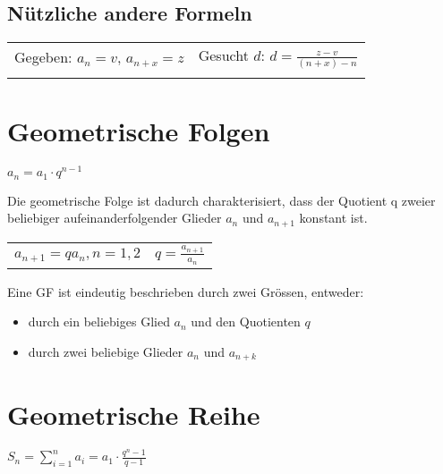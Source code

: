 \documentclass[../main.tex]{subfiles}
\begin{document}
\subsection{Nützliche andere Formeln}

\begin{tabularx}{1\textwidth} { 
    >{\centering\arraybackslash}X 
    >{\centering\arraybackslash}X  }
    Gegeben: $a_n = v$, $a_{n+x} = z$
    &
    Gesucht $d$: $d = \frac{z - v}{(n+x) -n}$
    \\ [7pt]
    \begin{math}
        {}
    \end{math}
    &
    \begin{math}
        {}
    \end{math}
    \\ [7pt]
\end{tabularx}


\section{Geometrische Folgen}
$a_n=a_1\cdot q^{n-1}$
\begin{flushleft}
    Die geometrische Folge ist dadurch charakterisiert, dass der Quotient q zweier beliebiger aufeinanderfolgender Glieder $a_n$ und $a_{n+1}$ konstant ist.
\end{flushleft}

\begin{tabularx}{0.8\textwidth} { 
    >{\centering\arraybackslash}X 
    >{\centering\arraybackslash}X  }
    \begin{math}
        a_{n+1} = qa_n, n=1,2
    \end{math}
    &
    \begin{math}
        q = \frac{a_{n+1}}{a_n}
    \end{math}
    \\ [7pt]
\end{tabularx}

Eine GF ist eindeutig beschrieben durch zwei Grössen, entweder:
\begin{itemize}
    \item durch ein beliebiges Glied $a_n$ und den Quotienten $q$
    \item durch zwei beliebige Glieder $a_n$ und $a_{n+k}$
\end{itemize}

\section{Geometrische Reihe}
$S_n=\sum\limits_{i=1}^na_i=a_1\cdot\frac{q^n-1}{q-1}$
\end{document}
